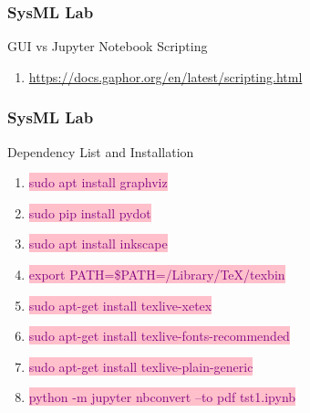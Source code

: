\begin{frame}
\frametitle{SysML Lab}
\begin{block}{ GUI vs Jupyter Notebook  Scripting }

\begin{enumerate} 
\item    \url{https://docs.gaphor.org/en/latest/scripting.html }
\end{enumerate}


\end{block}
\end{frame}



\newpage

\begin{frame}
\frametitle{SysML Lab}
\begin{block}{ Dependency List and Installation }

\begin{enumerate} 
\item    \colorbox{pink}{ \textcolor{purple}{sudo apt install graphviz } }  
\item    \colorbox{pink}{ \textcolor{purple}{sudo pip install pydot } }
\item    \colorbox{pink}{ \textcolor{purple}{sudo apt  install inkscape } }  
\item    \colorbox{pink}{ \textcolor{purple}{export PATH=\$PATH=/Library/TeX/texbin } }  
\item    \colorbox{pink}{ \textcolor{purple}{sudo apt-get install texlive-xetex  } }  
\item    \colorbox{pink}{ \textcolor{purple}{sudo apt-get install  texlive-fonts-recommended  } } 
\item    \colorbox{pink}{ \textcolor{purple}{sudo apt-get install  texlive-plain-generic } } 
\item    \colorbox{pink}{ \textcolor{purple}{  python -m jupyter nbconvert --to pdf tst1.ipynb} }  
\end{enumerate}


\end{block}
\end{frame}
